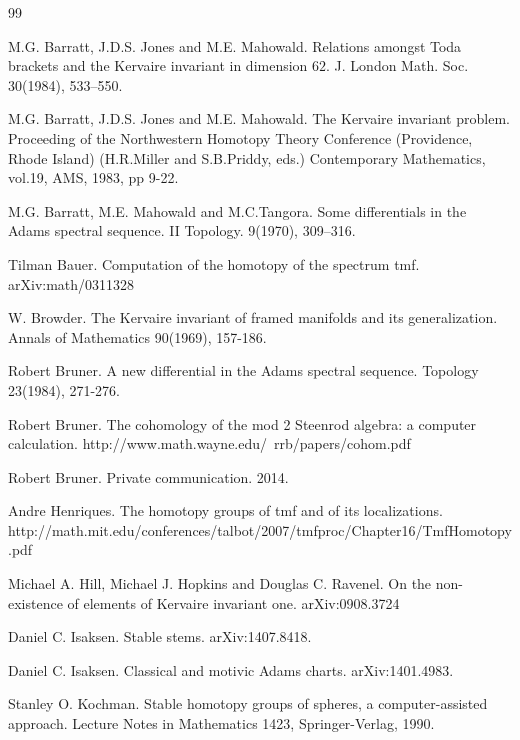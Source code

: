 \documentclass[psamsfonts]{amsart}
\theoremstyle{definition}
\numberwithin{equation}{section}
\begin{document}
\begin{thebibliography}{99}

M.G. Barratt, J.D.S. Jones and M.E. Mahowald.
Relations amongst Toda brackets and the Kervaire invariant in dimension $62$.
J. London Math. Soc. 30(1984), 533--550.

M.G. Barratt, J.D.S. Jones and M.E. Mahowald.
The Kervaire invariant problem.
Proceeding of the Northwestern Homotopy Theory Conference (Providence, Rhode Island) (H.R.Miller and S.B.Priddy, eds.) Contemporary Mathematics, vol.19, AMS, 1983, pp 9-22.


M.G. Barratt, M.E. Mahowald and M.C.Tangora.
Some differentials in the Adams spectral sequence. II
Topology. 9(1970), 309--316.

Tilman Bauer.
Computation of the homotopy of the spectrum tmf.
arXiv:math/0311328

W. Browder.
The Kervaire invariant of framed manifolds and its generalization.
Annals of Mathematics 90(1969), 157-186.

Robert Bruner.
A new differential in the Adams spectral sequence.
Topology 23(1984), 271-276.

Robert Bruner.
The cohomology of the mod 2 Steenrod algebra: a computer calculation. http://www.math.wayne.edu/~rrb/papers/cohom.pdf %

Robert Bruner.
Private communication. 2014.

Andre Henriques.
The homotopy groups of tmf and of its localizations.
http://math.mit.edu/conferences/talbot/2007/tmfproc/Chapter16/TmfHomotopy.pdf

Michael A. Hill, Michael J. Hopkins and Douglas C. Ravenel.
On the non-existence of elements of Kervaire invariant one.
arXiv:0908.3724

Daniel C. Isaksen.
Stable stems.
arXiv:1407.8418. %

Daniel C. Isaksen.
Classical and motivic Adams charts.
arXiv:1401.4983.


Stanley O. Kochman.
Stable homotopy groups of spheres, a computer-assisted approach.
Lecture Notes in Mathematics 1423, Springer-Verlag, 1990.


\end{thebibliography}
\end{document}

